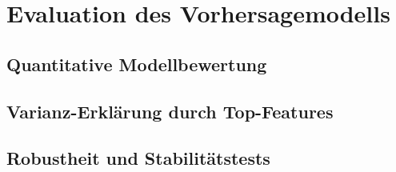 \chapter{Evaluation des Vorhersagemodells}
\section{Quantitative Modellbewertung}
\section{Varianz-Erklärung durch Top-Features}
\section{Robustheit und Stabilitätstests}